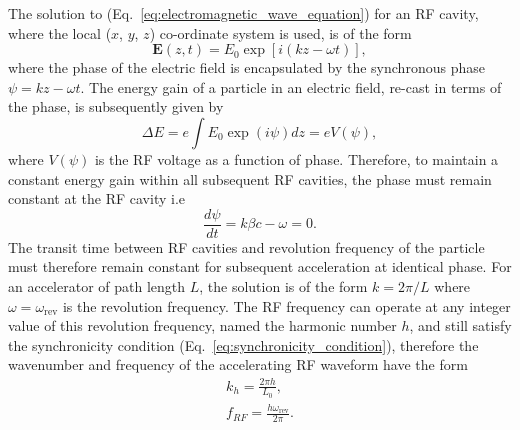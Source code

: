 \documentclass[../main.tex]{subfiles}
\begin{document}
The solution to (Eq.~\ref{eq:electromagnetic_wave_equation}) for an RF cavity, where the local ($x$, $y$, $z$) co-ordinate system is used, is of the form
\begin{equation}
\boldsymbol{E}\left(z,t\right) = E_{0}\exp\left[i\left(kz-\omega t\right)\right],
\label{eq:RF_cavity_electric_field}    
\end{equation}
where the phase of the electric field is encapsulated by the synchronous phase $\psi = kz-\omega t$. The energy gain of a particle in an electric field, re-cast in terms of the phase, is subsequently given by 
\begin{equation}
\Delta E = e \int E_{0}\exp\left(i\psi\right)dz = eV\left(\psi\right),
\label{eq:particle_energy_gain_RF}    
\end{equation}
where $V\left(\psi\right)$ is the RF voltage as a function of phase. Therefore, to maintain a constant energy gain within all subsequent RF cavities, the phase must remain constant at the RF cavity i.e
\begin{equation}
\frac{d\psi}{dt} = k\beta c-\omega = 0. 
\label{eq:synchronicity_condition}   
\end{equation}
The transit time between RF cavities and revolution frequency of the particle must therefore remain constant for subsequent acceleration at identical phase. For an accelerator of path length $L$, the solution is of the form $k=2\pi/L$ where $\omega=\omega_{\mathrm{rev}}$ is the revolution frequency. The RF frequency can operate at any integer value of this revolution frequency, named the harmonic number $h$, and still satisfy the synchronicity condition (Eq.~\ref{eq:synchronicity_condition}), therefore the wavenumber and frequency of the accelerating RF waveform have the form
\begin{align}
k_{h} = \frac{2\pi h}{L_{0}},
\label{eq:RF_wavenumber} \\
f_{RF} = \frac{h\omega_{\mathrm{rev}}}{2\pi}.
\label{eq:RF_frequency}
\end{align}
\end{document}
